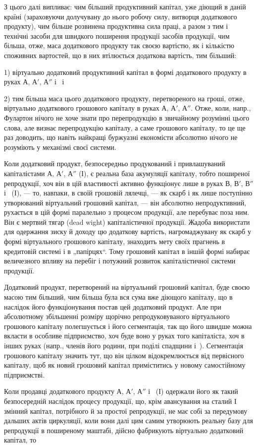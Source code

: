 
З цього далі випливає: чим більший продуктивний капітал, уже
діющий в даній країні (зараховуючи долучувану до нього робочу силу,
витворця додаткового продукту), чим більше розвинена продуктивна сила
праці, а разом з тим і технічні засоби для швидкого поширення продукції
засобів продукції, чим більша, отже, маса додаткового продукту
так своєю вартістю, як і кількістю споживних вартостей, що в них
втілюється додаткова вартість, тим більший:

1) віртуально додатковий продуктивний капітал в формі додаткового
продукту в руках $А$, $А'$, $А''$ і~ і

2) тим більша маса цього додаткового продукту, перетвореного на
гроші, отже, віртуально додаткового грошового капіталу в руках $А$, $А'$, $А''$.
Отже, коли, напр., Фулартон нічого не хоче знати про перепродукцію
в звичайному розумінні цього слова, але визнає перепродукцію капіталу,
а саме грошового капіталу, то це ще раз доводить, що навіть найкращі
буржуазні економісти абсолютно нічого не розуміють у механізмі своєї
системи.

Коли додатковий продукт, безпосередньо продукований і привлашуваний
капіталістами $А$, $А'$, $А''$ (І), є реальна база акумуляції капіталу,
тобто поширеної репродукції, хоч він в цій властивості активно функціонує
лише в руках $В$, $В'$, $В''$ і~ (І), — то, навпаки, в своїй грошовій
лялечці, — як скарб і як лише поступінно утворюваний віртуальний
грошовий капітал, — він абсолютно непродуктивний, рухається
в цій формі паралельно з процесом продукції, але перебуває поза ним.
Він є мертвий тягар (dead wight) капіталістичної продукції. Жадоба використати
для одержання зиску й доходу цю додаткову вартість, нагромаджувану
як скарб у формі віртуального грошового капіталу, знаходить
мету своїх прагнень в кредитовій системі і в „папірцях“. Тому грошовий
капітал в іншій формі набирає величезного впливу на перебіг і потужний
розвиток капіталістичної системи продукції.

Додатковий продукт, перетворений на віртуальний грошовий капітал,
буде своєю масою тим більший, чим більша була вся сума вже діющого
капіталу, що в наслідок його функціонування постав цей додатковий
продукт. Але при абсолютному збільшенні розміру щорічно репродуковуваного
віртуального грошового капіталу полегшується і його сегментація,
так що його швидше можна вкласти в особливе підприємство, хоч буде
воно у руках того капіталіста, хоч в інших руках (напр., членів його родини,
при поділі спадщини і~). Сегментація грошового капіталу значить
тут, що він цілком відокремлюється від первісного капіталу, щоб як
новий грошовий капітал приміститись у новому самостійному підприємстві.

Коли продавці додаткового продукту $А$, $А'$, $А''$ і~ (І) одержали
його як такий безпосередній наслідок процесу продукції, що, крім авансування
на сталий І змінний капітал, потрібного й за простої репродукції,
не має собі за передумову дальших актів циркуляції, коли вони
далі цим самим утворюють реальну базу для репродукції в поширеному
маштабі, дійсно фабрикують віртуально додатковий капітал, то
\parbreak{}  %
